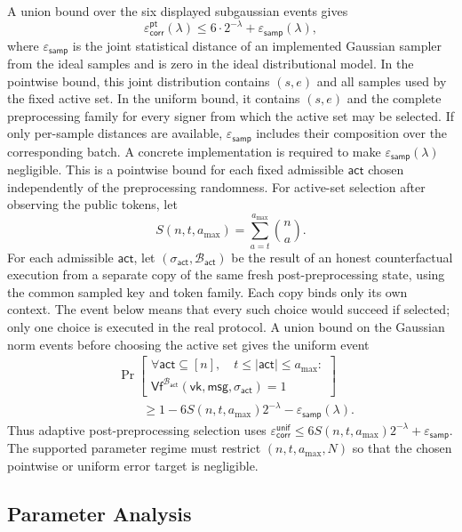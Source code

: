 \documentclass[lettersize,journal]{IEEEtran}
\begin{document}
A union bound over the six
displayed subgaussian events gives
\[
\varepsilon_{\mathsf{corr}}^{\mathsf{pt}}(\lambda)
\leq
6\cdot2^{-\lambda}+\varepsilon_{\mathsf{samp}}(\lambda),
\]
where $\varepsilon_{\mathsf{samp}}$ is the joint statistical distance of an
implemented Gaussian sampler from the ideal samples and is zero in the ideal
distributional model. In the pointwise bound, this joint distribution contains
$(s,e)$ and all samples used by the fixed active set. In the uniform bound, it
contains $(s,e)$ and the complete preprocessing family for every signer from
which the active set may be selected. If only per-sample distances are
available, $\varepsilon_{\mathsf{samp}}$ includes their composition over the
corresponding batch. {A concrete implementation is
required to make $\varepsilon_{\mathsf{samp}}(\lambda)$ negligible. This is a
pointwise bound for each fixed admissible $\mathsf{act}$ chosen independently
of the preprocessing randomness. For active-set selection after observing the
public tokens, let
\[
S(n,t,a_{\max})
=
\sum_{a=t}^{a_{\max}}\binom{n}{a}.
\]
For each admissible $\mathsf{act}$, let
$(\sigma_{\mathsf{act}},\mathcal B_{\mathsf{act}})$ be the result of an
honest counterfactual execution from a separate copy of the same fresh
post-preprocessing state, using the common sampled key and token family.
Each copy binds only its own context. The event below means that every
such choice would succeed if selected; only one choice is executed in the
real protocol. A union bound on the Gaussian norm events before choosing
the active set gives the uniform event
\[
\begin{aligned}
&\Pr\!\left[
\begin{array}{c}
\forall\mathsf{act}\subseteq[n],\quad
t\leq|\mathsf{act}|\leq a_{\max}:\\
\mathsf{Vf}^{\mathcal B_{\mathsf{act}}}
(\mathsf{vk},\mathsf{msg},\sigma_{\mathsf{act}})=1
\end{array}
\right]\\
&\qquad\geq
1-6S(n,t,a_{\max})2^{-\lambda}
-\varepsilon_{\mathsf{samp}}(\lambda).
\end{aligned}
\]
Thus adaptive post-preprocessing selection uses
$\varepsilon_{\mathsf{corr}}^{\mathsf{unif}}
\leq6S(n,t,a_{\max})2^{-\lambda}+\varepsilon_{\mathsf{samp}}$.
The supported parameter regime must restrict $(n,t,a_{\max},N)$ so that the
chosen pointwise or uniform error target is negligible.}
\subsection{Parameter Analysis}
\label{app:tt128r1-parameters}
\end{document}
